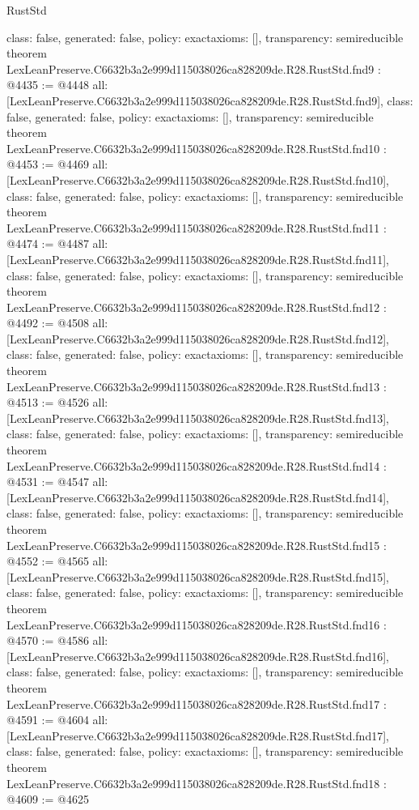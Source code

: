 \begin{lexlean}{RustStd}
\begin{coremodule}
{  class: false,
  generated: false,
  policy: exact{axioms: []},
  transparency: semireducible
}
theorem LexLeanPreserve.C6632b3a2e999d115038026ca828209de.R28.RustStd.fnd9 : @4435 := @4448 {
  all: [LexLeanPreserve.C6632b3a2e999d115038026ca828209de.R28.RustStd.fnd9],
  class: false,
  generated: false,
  policy: exact{axioms: []},
  transparency: semireducible
}
theorem LexLeanPreserve.C6632b3a2e999d115038026ca828209de.R28.RustStd.fnd10 : @4453 := @4469 {
  all: [LexLeanPreserve.C6632b3a2e999d115038026ca828209de.R28.RustStd.fnd10],
  class: false,
  generated: false,
  policy: exact{axioms: []},
  transparency: semireducible
}
theorem LexLeanPreserve.C6632b3a2e999d115038026ca828209de.R28.RustStd.fnd11 : @4474 := @4487 {
  all: [LexLeanPreserve.C6632b3a2e999d115038026ca828209de.R28.RustStd.fnd11],
  class: false,
  generated: false,
  policy: exact{axioms: []},
  transparency: semireducible
}
theorem LexLeanPreserve.C6632b3a2e999d115038026ca828209de.R28.RustStd.fnd12 : @4492 := @4508 {
  all: [LexLeanPreserve.C6632b3a2e999d115038026ca828209de.R28.RustStd.fnd12],
  class: false,
  generated: false,
  policy: exact{axioms: []},
  transparency: semireducible
}
theorem LexLeanPreserve.C6632b3a2e999d115038026ca828209de.R28.RustStd.fnd13 : @4513 := @4526 {
  all: [LexLeanPreserve.C6632b3a2e999d115038026ca828209de.R28.RustStd.fnd13],
  class: false,
  generated: false,
  policy: exact{axioms: []},
  transparency: semireducible
}
theorem LexLeanPreserve.C6632b3a2e999d115038026ca828209de.R28.RustStd.fnd14 : @4531 := @4547 {
  all: [LexLeanPreserve.C6632b3a2e999d115038026ca828209de.R28.RustStd.fnd14],
  class: false,
  generated: false,
  policy: exact{axioms: []},
  transparency: semireducible
}
theorem LexLeanPreserve.C6632b3a2e999d115038026ca828209de.R28.RustStd.fnd15 : @4552 := @4565 {
  all: [LexLeanPreserve.C6632b3a2e999d115038026ca828209de.R28.RustStd.fnd15],
  class: false,
  generated: false,
  policy: exact{axioms: []},
  transparency: semireducible
}
theorem LexLeanPreserve.C6632b3a2e999d115038026ca828209de.R28.RustStd.fnd16 : @4570 := @4586 {
  all: [LexLeanPreserve.C6632b3a2e999d115038026ca828209de.R28.RustStd.fnd16],
  class: false,
  generated: false,
  policy: exact{axioms: []},
  transparency: semireducible
}
theorem LexLeanPreserve.C6632b3a2e999d115038026ca828209de.R28.RustStd.fnd17 : @4591 := @4604 {
  all: [LexLeanPreserve.C6632b3a2e999d115038026ca828209de.R28.RustStd.fnd17],
  class: false,
  generated: false,
  policy: exact{axioms: []},
  transparency: semireducible
}
theorem LexLeanPreserve.C6632b3a2e999d115038026ca828209de.R28.RustStd.fnd18 : @4609 := @4625 {
}
\end{coremodule}
\end{lexlean}
